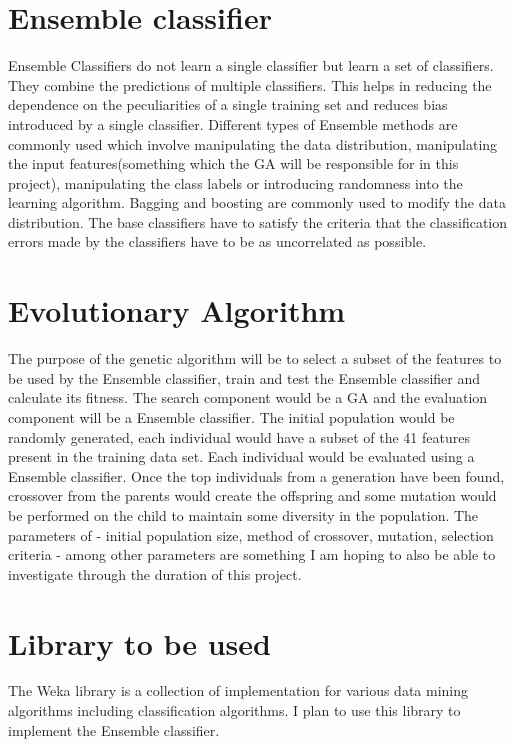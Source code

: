 \documentclass{article}
\begin{document}
\section{Ensemble classifier}
Ensemble Classifiers do not learn a single classifier but learn a set of classifiers. They combine the predictions of multiple classifiers. This helps in reducing the dependence on the peculiarities of a single training set and reduces bias introduced by a single classifier. Different types of Ensemble methods are commonly used which involve manipulating the data distribution, manipulating the input features(something which the GA will be responsible for in this project), manipulating the class labels or introducing randomness into the learning algorithm. Bagging and boosting are commonly used to modify the data distribution. The base classifiers have to satisfy the criteria that the classification errors made by the classifiers have to be as uncorrelated as possible.  

\section{Evolutionary Algorithm}
The purpose of the genetic algorithm will be to select a subset of the features to be used by the Ensemble classifier, train and test the Ensemble classifier and calculate its fitness. The search component would be a GA and the evaluation component will be a Ensemble classifier. The initial population would be randomly generated, each individual would have a subset of the 41 features present in the training data set. Each individual would be evaluated using a Ensemble classifier. Once the top individuals from a generation have been found, crossover from the parents would create the offspring and some mutation would be performed on the child to maintain some diversity in the population. The parameters of - initial population size, method of crossover, mutation, selection criteria - among other parameters are something I am hoping to also be able to investigate through the duration of this project. 

\section{Library to be used}
The Weka library\cite{weka} is a collection of implementation for various data mining algorithms including classification algorithms. I plan to use this library to implement the Ensemble classifier.



\end{document}
